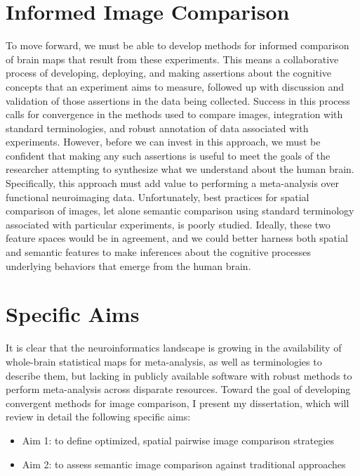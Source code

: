 \documentclass{report}
\begin{document}
\section{Informed Image Comparison}

To move forward, we must be able to develop methods for informed comparison of brain
maps that result from these experiments. This means a collaborative
process of developing, deploying, and making assertions about the
cognitive concepts that an experiment aims to measure, followed up with
discussion and validation of those assertions in the data being
collected. Success in this process calls for convergence in the
methods used to compare images, integration with standard
terminologies, and robust annotation of data associated with
experiments. However, before we can invest in this approach, we must be
confident that making any such assertions is useful to meet the goals of
the researcher attempting to synthesize what we understand about the
human brain. Specifically, this approach must add value to performing a
meta-analysis over functional neuroimaging data. Unfortunately, best
practices for spatial comparison of images, let alone semantic
comparison using standard terminology associated with particular
experiments, is poorly studied. Ideally, these two feature spaces would
be in agreement, and we could better harness both spatial and semantic
features to make inferences about the cognitive processes underlying
behaviors that emerge from the human brain.

\section{Specific Aims}
It is clear that the neuroinformatics landscape is growing in the
availability of whole-brain statistical maps for meta-analysis, as well
as terminologies to describe them, but lacking in publicly available software with robust methods to perform meta-analysis across disparate resources. Toward the goal of
developing convergent methods for image comparison, I present my dissertation, which will review in detail the
following specific aims:

\begin{itemize}
\item
  Aim 1: to define optimized, spatial pairwise image comparison
  strategies
\end{itemize}

\begin{itemize}
\item
  Aim 2: to assess semantic image comparison against traditional
  approaches
\end{itemize}
\end{document}
